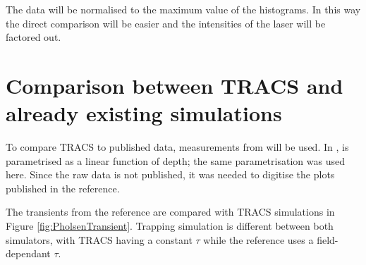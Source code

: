

The data will be normalised to the maximum value of the histograms. In this way the direct comparison will be easier and the intensities of the laser will be factored out.%

\section{Comparison between TRACS and already existing simulations}

To compare TRACS to published data, measurements from \cite{Pholsen} will be used. In \cite{Pholsen}, \neff is parametrised as a linear function of depth; the same parametrisation was used here. Since the raw data is not published, it was needed to digitise the plots published in the reference.
%

The transients from the reference are compared with TRACS simulations in Figure \ref{fig:PholsenTransient}.  Trapping simulation is different between both simulators, with TRACS having a constant $\tau$ while the reference uses a field-dependant $\tau$.%

